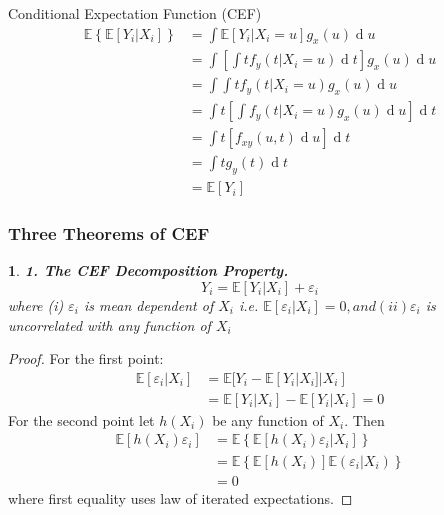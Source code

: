 \documentclass{beamer}
\theoremstyle{plain}
\newtheorem*{customthm}{} %
\newcommand{\customtheorem}[2]{
	\begin{customthm}
		\textbf{#1.} #2
	\end{customthm}
}
\begin{document}
\begin{frame}{Conditional Expectation Function (CEF)}
	\begin{align*}
		\mathbb E \left\{ \mathbb E[Y_i| X_i]  \right\} &= \int \mathbb E[Y_i | X_i = u] g_x(u) \operatorname{d}u\\
		&= \int \left[ \int t f_y(t|X_i = u) \operatorname{d}t \right] g_x(u) \operatorname{d}u\\
		&= \int\int t f_y(t | X_i = u) g_x(u) \operatorname{d}u\\
		&= \int t \left[\int f_y(t | X_i = u) g_x(u)\operatorname{d}u \right]\operatorname{d}t\\
		&= \int t \left[f_{xy}(u,t)\operatorname{d}u \right]\operatorname{d}t\\
		&= \int t g_y(t) \operatorname{d}t \\
		&= \mathbb E[Y_i]
	\end{align*}
\end{frame}


\begin{frame}
	\frametitle{Three Theorems of CEF}
\customtheorem{1. The CEF Decomposition Property}{$$ Y_i = \mathbb E[Y_i | X_i] + \varepsilon_i$$
	where (i) $\varepsilon_i$ is mean dependent of $X_i$ i.e. $\mathbb E[\varepsilon_i| X_i] = 0, and (ii) \varepsilon_i$ is uncorrelated with any function of $X_i$}
	\begin{proof}
		For the first point:
		\begin{align*} 
			\mathbb E[\varepsilon_i | X_i] &= \mathbb E[Y_i - \mathbb E[Y_i|X_i] | X_i]\\
			&= \mathbb E[Y_i | X_i] - \mathbb E[Y_i | X_i] = 0
		\end{align*}
		For the second point let $h(X_i)$ be any function of $X_i$. Then
		\begin{align*}
			\mathbb E[h(X_i)\varepsilon_i] &= \mathbb E\left\{\mathbb E[h(X_i)\varepsilon_i|X_i]\right\}\\
			&= \mathbb E\left\{ \mathbb{E} [h(X_i)] \mathbb E(\varepsilon_i|X_i) \right\}\\
			&= 0
		\end{align*}
		where first equality uses law of iterated expectations.
	\end{proof}
\end{frame}
\end{document}
